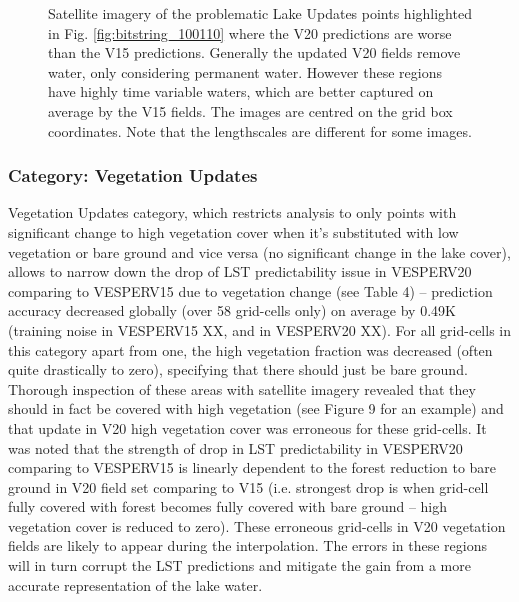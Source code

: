 \documentclass[hess, manuscript]{copernicus}
\begin{document}
\begin{figure}
	\caption{Satellite imagery of the problematic Lake Updates points highlighted in Fig. \ref{fig:bitstring_100110} where the V20 predictions are worse than the V15 predictions. Generally the updated V20 fields remove water, only considering permanent water. However these regions have highly time variable waters, which are better captured on average by the V15 fields. The images are centred on the grid box coordinates. Note that the lengthscales are different for some images.} 
	\label{fig:example_test}
\end{figure}



\subsubsection{Category: Vegetation Updates}


Vegetation Updates category, which restricts analysis to only points with significant change to high vegetation cover when it’s substituted with low vegetation or bare ground and vice versa (no significant change in the lake cover), allows to narrow down the drop of LST predictability issue in VESPERV20 comparing to VESPERV15 due to vegetation change (see Table 4) – prediction accuracy decreased globally (over 58 grid-cells only) on average by 0.49K (training noise in VESPERV15 XX, and in VESPERV20 XX). For all grid-cells in this category apart from one, the high vegetation fraction was decreased (often quite drastically to zero), specifying that there should just be bare ground. Thorough inspection of these areas with satellite imagery revealed that they should in fact be covered with high vegetation (see Figure 9 for an example) and that update in V20 high vegetation cover was erroneous for these grid-cells. It was noted that the strength of drop in LST predictability in VESPERV20 comparing to VESPERV15 is linearly dependent to the forest reduction to bare ground in V20 field set comparing to V15 (i.e. strongest drop is when grid-cell fully covered with forest becomes fully covered with bare ground – high vegetation cover is reduced to zero). These erroneous grid-cells in V20 vegetation fields are likely to appear during the interpolation. The errors in these regions will in turn corrupt the LST predictions and mitigate the gain from a more accurate representation of the lake water.
\end{document}
